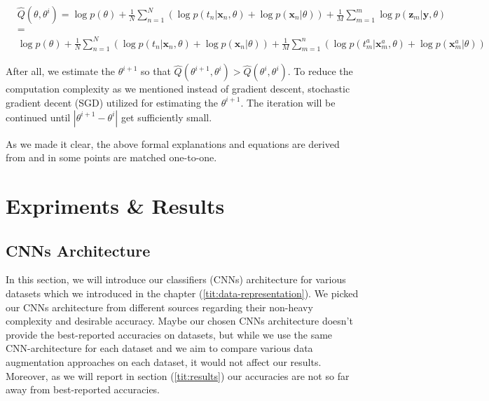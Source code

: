 \begin{equation}
  \begin{aligned}
     & \hat{Q}\left(\theta, \theta^{i}\right)=\log p(\theta)+\frac{1}{N} \sum_{n=1}^{N}\left(\log p\left(t_{n} | \mathbf{x}_{n}, \theta\right)+\log p\left(\mathbf{x}_{n} | \theta\right)\right)+\frac{1}{M} \sum_{m=1}^{m} \log p\left(\mathbf{z}_{m} | \mathbf{y}, \theta\right) \\
     & =                                                                                                                                                                                                                                                                           \\
     & \log p(\theta)+\frac{1}{N} \sum_{n=1}^{N}\left(\log p\left(t_{n} | \mathbf{x}_{n}, \theta\right)+\log p\left(\mathbf{x}_{n} | \theta\right)\right)+\frac{1}{M}
    \sum_{m=1}^{n}\left(\log p\left(t_{m}^{a} | \mathbf{x}_{m}^{a}, \theta\right)+\log p\left(\mathbf{x}_{m}^{a} | \theta\right)\right)
  \end{aligned}
\end{equation}

After all, we estimate the $\theta^{i +1}$ so that $\hat{Q}(\theta^{i +1}, \theta^{i}) >
\hat{Q}(\theta^{i}, \theta^{i})$. To reduce the computation complexity as we mentioned instead of
gradient descent, stochastic gradient decent (SGD) utilized for estimating the $\theta^{i +1}$. The
iteration will be continued until $|\theta^{i +1} - \theta^{i}|$ get sufficiently small. 

As we made it clear, the above formal explanations and equations are derived from \cite{bayesian_approach} and in some points are matched one-to-one.  


\chapter{Expriments \& Results}
\section{CNNs Architecture}
In this section, we will introduce our classifiers (CNNs) architecture for various datasets which we
introduced in the chapter (\ref{tit:data-representation}). We picked our CNNs architecture from
different sources regarding their non-heavy complexity and desirable accuracy.  Maybe our chosen
CNNs architecture doesn't provide the best-reported accuracies on datasets, but while we use the
same CNN-architecture for each dataset and we aim to compare various data augmentation approaches on
each dataset, it would not affect our results. Moreover, as we will report in section (\ref{tit:results})
our accuracies are not so far away from best-reported accuracies.

